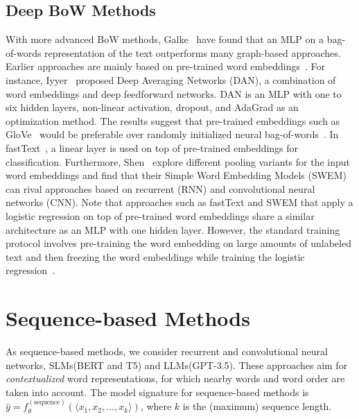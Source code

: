 \documentclass[lettersize,journal]{IEEEtran}
\newcommand{\SLMs}{SLMs\xspace}
\newcommand{\LLMs}{LLMs\xspace}
\begin{document}
\subsection{Deep BoW Methods}

With more advanced BoW methods, Galke~\etal\cite{galkescherp-acl2022} have found that an MLP on a bag-of-words representation of the text outperforms many graph-based approaches.
Earlier approaches are mainly based on pre-trained word embeddings~\cite{DBLP:conf/nips/MikolovSCCD13,DBLP:conf/emnlp/PenningtonSM14}.
For instance, Iyyer~\etal\cite{DBLP:conf/acl/IyyerMBD15} proposed Deep Averaging Networks (DAN), a combination of word embeddings and deep feedforward networks.
DAN is an MLP with one to six hidden layers, non-linear activation, dropout, and AdaGrad as an optimization method.
The results suggest that pre-trained embeddings such as GloVe~\cite{DBLP:conf/emnlp/PenningtonSM14} would be preferable over randomly initialized neural bag-of-words~\cite{DBLP:conf/acl/KalchbrennerGB14}.
In fastText~\cite{DBLP:journals/tacl/BojanowskiGJM17,DBLP:conf/eacl/GraveMJB17}, a linear layer is used on top of pre-trained embeddings for classification.
Furthermore, Shen~\etal\cite{DBLP:conf/acl/HenaoLCSSWWMZ18} explore different pooling variants for the input word embeddings and find that their Simple Word Embedding Models (SWEM) can rival approaches based on recurrent (RNN) and convolutional neural networks (CNN).
Note that approaches such as fastText and SWEM that apply a logistic regression on top of pre-trained word embeddings share a similar architecture as an MLP with one hidden layer. 
However, the standard training protocol involves pre-training the word embedding on large amounts of unlabeled text and then freezing the word embeddings while training the logistic regression~\cite{DBLP:conf/nips/MikolovSCCD13}.

\section{Sequence-based Methods}\label{sec:sequence}
As sequence-based methods, we consider recurrent and convolutional neural networks, \SLMs (\eg BERT and T5) and \LLMs (\eg GPT-3.5). 
These approaches aim for \emph{contextualized} word representations, for which nearby words and word order are taken into account.
The model signature for sequence-based methods is
$\hat{y} = f_\theta^{(\mathrm{sequence})} ( \langle x_1, x_2, \ldots, x_k \rangle )$,
where $k$ is the (maximum) sequence length.
\end{document}
